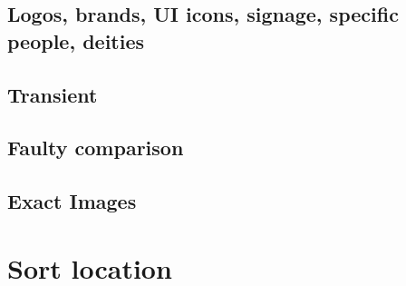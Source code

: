 \documentclass{article}
\begin{document}
\subsection{Logos, brands, UI icons, signage, specific people, deities}
\subsection{Transient}
\subsection{Faulty comparison}
\subsection{Exact Images}

\section{Sort location}
\end{document}
